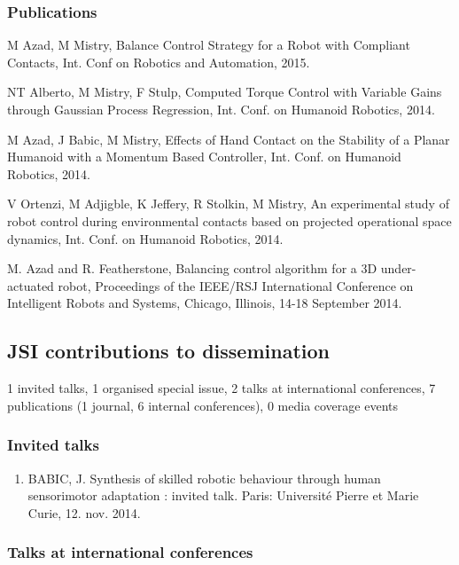 \subsubsection{Publications}

M Azad, M Mistry, Balance Control Strategy for a Robot with Compliant Contacts, Int. Conf on Robotics and Automation, 2015.

NT Alberto, M Mistry, F Stulp, Computed Torque Control with Variable Gains through Gaussian Process Regression, Int. Conf. on Humanoid Robotics, 2014.

M Azad, J Babic, M Mistry, Effects of Hand Contact on the Stability of a Planar Humanoid with a Momentum Based Controller, Int. Conf. on Humanoid Robotics, 2014.

V Ortenzi, M Adjigble, K Jeffery, R Stolkin, M Mistry, An experimental study of robot control during environmental contacts based on projected operational space dynamics, Int. Conf. on Humanoid Robotics, 2014.

M. Azad and R. Featherstone, Balancing control algorithm for a 3D under-actuated robot, Proceedings of the IEEE/RSJ International Conference on Intelligent Robots and Systems, Chicago, Illinois, 14-18 September 2014.

\subsection{JSI contributions to dissemination}

1 invited talks, 1 organised special issue, 2 talks at international conferences, 7 publications (1 journal, 6 internal conferences), 0 media coverage events

\subsubsection{Invited talks}

\begin{enumerate}

\item BABIC, J. Synthesis of skilled robotic behaviour through human sensorimotor adaptation : invited talk. Paris: Université Pierre et Marie Curie, 12. nov. 2014.

\end{enumerate}

\subsubsection{Talks at international conferences}


